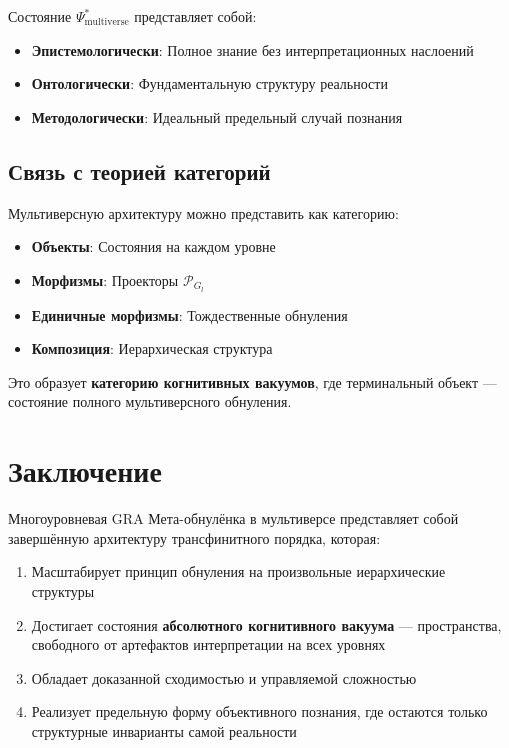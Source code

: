 \documentclass[12pt,a4paper]{article}
\newcommand{\calP}{\mathcal{P}}
\begin{document}
Состояние $\Psi_{\text{multiverse}}^*$ представляет собой:
\begin{itemize}
    \item \textbf{Эпистемологически}: Полное знание без интерпретационных наслоений
    \item \textbf{Онтологически}: Фундаментальную структуру реальности
    \item \textbf{Методологически}: Идеальный предельный случай познания
\end{itemize}

\subsection{Связь с теорией категорий}

Мультиверсную архитектуру можно представить как категорию:
\begin{itemize}
    \item \textbf{Объекты}: Состояния на каждом уровне
    \item \textbf{Морфизмы}: Проекторы $\calP_{G_l}$
    \item \textbf{Единичные морфизмы}: Тождественные обнуления
    \item \textbf{Композиция}: Иерархическая структура
\end{itemize}

Это образует \textbf{категорию когнитивных вакуумов}, где терминальный объект --- состояние полного мультиверсного обнуления.

\section{Заключение}

Многоуровневая GRA Мета-обнулёнка в мультиверсе представляет собой завершённую архитектуру трансфинитного порядка, которая:
\begin{enumerate}
    \item Масштабирует принцип обнуления на произвольные иерархические структуры
    \item Достигает состояния \textbf{абсолютного когнитивного вакуума} --- пространства, свободного от артефактов интерпретации на всех уровнях
    \item Обладает доказанной сходимостью и управляемой сложностью
    \item Реализует предельную форму объективного познания, где остаются только структурные инварианты самой реальности
\end{enumerate}
\end{document}
